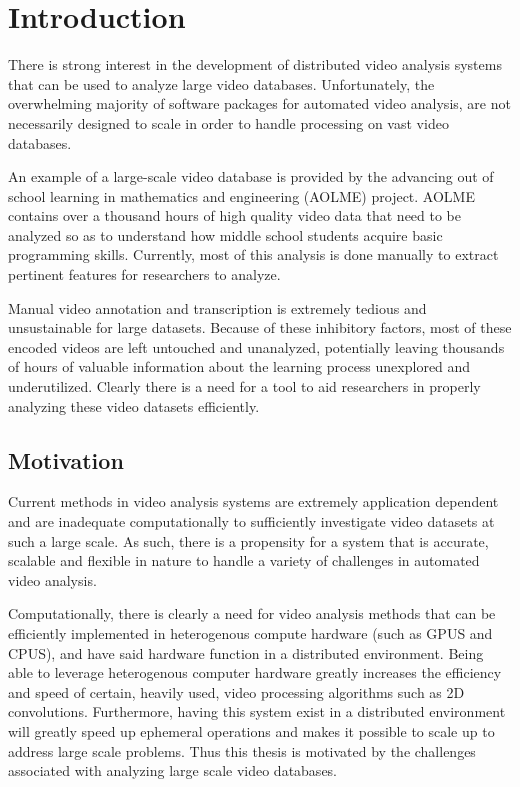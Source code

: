 \chapter{Introduction}
There is strong interest in the development of distributed video analysis
systems that can be used to analyze large video databases. Unfortunately, the
overwhelming majority of software packages for automated video analysis, are not
necessarily designed to scale in order to handle processing on vast video
databases.

An example of a large-scale video database is  provided by the advancing out of
school learning in mathematics and engineering (AOLME) project. AOLME contains
over a thousand hours of high quality video data that need to be analyzed so as
to understand how middle school students acquire basic programming skills.
Currently, most of this analysis is done manually \cite{LopezLeiva2016} to
extract pertinent features for researchers to analyze.

Manual video annotation and transcription is extremely tedious and unsustainable
for large datasets. Because of these inhibitory factors, most of these
encoded videos are left untouched and unanalyzed, potentially leaving thousands
of hours of valuable information about the learning process unexplored and
underutilized.  Clearly there is a need for a tool to aid researchers in
properly analyzing these video datasets efficiently.

\section{\label{section:motivation}Motivation}

Current methods in video analysis systems are extremely application dependent
and are inadequate computationally to sufficiently
investigate video datasets at such a large scale. As such, there is a propensity
for a system that is accurate, scalable and flexible in nature to handle a
variety of challenges in automated video analysis.

Computationally, there is clearly a need for video analysis methods that can be
efficiently implemented in heterogenous compute hardware (such as GPUS and
CPUS), and have said hardware function in a distributed environment. Being able
to leverage heterogenous computer hardware greatly increases the efficiency and
speed of certain, heavily used, video processing algorithms such as 2D
convolutions. Furthermore, having this system exist in a distributed environment
will greatly speed up ephemeral operations and makes it possible to scale up to
address large scale problems. Thus this thesis is motivated by the challenges
associated with analyzing large scale video databases.

